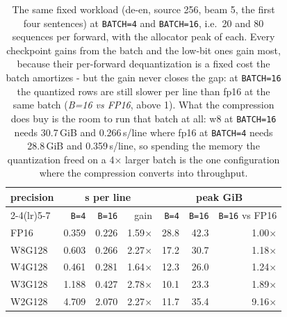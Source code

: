 \begin{table}[t]
\centering
\small
\setlength{\tabcolsep}{5pt}
\begin{tabular}{lrrrrrr}
\toprule
precision & \multicolumn{3}{c}{s per line} & \multicolumn{3}{c}{peak GiB} \\
\cmidrule(lr){2-4}\cmidrule(lr){5-7}
& \texttt{B=4} & \texttt{B=16} & gain & \texttt{B=4} & \texttt{B=16} & \texttt{B=16} vs FP16 \\
\midrule
FP16 & 0.359 & 0.226 & 1.59$\times$ & 28.8 & 42.3 & 1.00$\times$ \\
W8G128 & 0.603 & 0.266 & 2.27$\times$ & 17.2 & 30.7 & 1.18$\times$ \\
W4G128 & 0.461 & 0.281 & 1.64$\times$ & 12.3 & 26.0 & 1.24$\times$ \\
W3G128 & 1.188 & 0.427 & 2.78$\times$ & 10.1 & 23.3 & 1.89$\times$ \\
W2G128 & 4.709 & 2.070 & 2.27$\times$ & 11.7 & 35.4 & 9.16$\times$ \\
\bottomrule
\end{tabular}
\caption{The same fixed workload (de-en, source 256, beam 5, the first four sentences) at \texttt{BATCH=4} and \texttt{BATCH=16}, i.e.\ 20 and 80 sequences per forward, with the allocator peak of each. Every checkpoint gains from the batch and the low-bit ones gain most, because their per-forward dequantization is a fixed cost the batch amortizes - but the gain never closes the gap: at \texttt{BATCH=16} the quantized rows are still slower per line than fp16 at the same batch (\emph{B=16 vs FP16}, above 1). What the compression does buy is the room to run that batch at all: w8 at \texttt{BATCH=16} needs 30.7\,GiB and 0.266\,s/line where fp16 at \texttt{BATCH=4} needs 28.8\,GiB and 0.359\,s/line, so spending the memory the quantization freed on a 4$\times$ larger batch is the one configuration where the compression converts into throughput.}
\label{tab:batch}
\end{table}

